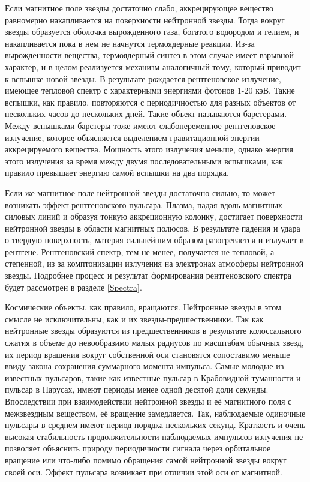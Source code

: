 \documentclass[14pt,a4paper]{extarticle}
\begin{document}
		    Если магнитное поле звезды достаточно слабо, аккрецирующее вещество равномерно накапливается на поверхности нейтронной звезды.
		    Тогда вокруг звезды образуется оболочка вырожденного газа, богатого водородом и гелием, и накапливается пока в нем не начнутся термоядерные реакции. 
		    Из-за вырожденности вещества, термоядерный синтез в этом случае имеет взрывной характер, и в целом реализуется механизм аналогичный тому, который приводит к вспышке новой звезды. 
		    В результате рождается рентгеновское излучение, имеющее тепловой спектр с характерными энергиями фотонов 1-20 кэВ. 
		    Такие вспышки, как правило, повторяются с периодичностью для разных объектов от нескольких часов до нескольких дней.
		    Такие объект называются барстерами. 
		    Между вспышками барстеры тоже имеют слабопеременное рентгеновское излучение, которое объясняется выделением гравитационной энергии аккрецируемого вещества. 
		    Мощность этого излучения меньше, однако энергия этого излучения за время между двумя последовательными вспышками, как правило превышает энергию самой вспышки на два порядка. 

		    Если же магнитное поле нейтронной звезды достаточно сильно, то может возникать эффект рентгеновского пульсара. 
		    Плазма, падая вдоль магнитных силовых линий и образуя тонкую аккреционную колонку, достигает поверхности нейтронной звезды в области магнитных полюсов.
		    В результате падения и удара о твердую поверхность, материя сильнейшим образом разогревается и излучает в рентгене. 
		    Рентгеновский спектр, тем не менее, получается не тепловой, а степенной, из за комптонизации излучения на электронах атмосферы нейтронной звезды. 
		    Подробнее процесс и результат формирования рентгеновского спектра будет рассмотрен в разделе \ref{Spectra}.


			Космические объекты, как правило, вращаются.
			Нейтронные звезды в этом смысле не исключительны, как и их звезды-предшественники. 
			Так как нейтронные звезды образуются из предшественников в результате колоссального сжатия в объеме до невообразимо малых радиусов по масштабам обычных звезд, их период вращения вокруг собственной оси становятся сопоставимо  меньше ввиду закона сохранения суммарного момента импульса. 
			Самые молодые из известных пульсаров, такие как известные пульсар в Крабовидной туманности и пульсар в Парусах, имеют периоды менее одной десятой доли секунды. 
			Впоследствии при взаимодействии нейтронной звезды и её магнитного поля с межзвездным веществом, её вращение замедляется. 
			Так, наблюдаемые одиночные пульсары в среднем имеют период порядка нескольких секунд. 
			Краткость и очень высокая стабильность продолжительности наблюдаемых импульсов излучения не позволяет объяснить природу периодичности сигнала через орбитальное вращение или что-либо помимо обращения самой нейтронной звезды вокруг своей оси. 
			Эффект пульсара возникает при отличии этой оси от магнитной.
\end{document}
